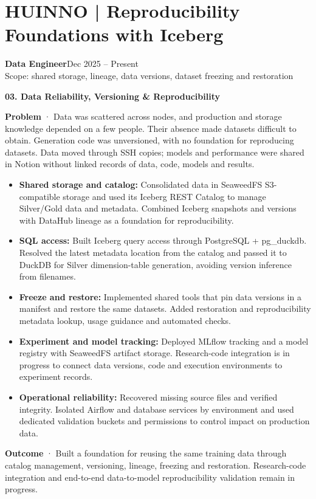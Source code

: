\documentclass[a4paper,10pt]{article}
\newcommand{\role}[3]{\textbf{#1}\hfill{\small #2}\\{\small\color{muted}#3}\par}
\newcommand{\project}[2]{\vspace{5pt}\textbf{\color{accent}#1}\hfill{\small\color{muted}#2}\par}
\begin{document}
\section{HUINNO | Reproducibility Foundations with Iceberg}
\role{Data Engineer}{Dec 2025 -- Present}{Scope: shared storage, lineage, data versions, dataset freezing and restoration}
\project{03. Data Reliability, Versioning \& Reproducibility}{}
\textbf{Problem} · Data was scattered across nodes, and production and storage knowledge depended on a few people. Their absence made datasets difficult to obtain. Generation code was unversioned, with no foundation for reproducing datasets. Data moved through SSH copies; models and performance were shared in Notion without linked records of data, code, models and results.
\begin{itemize}
\item \textbf{Shared storage and catalog:} Consolidated data in SeaweedFS S3-compatible storage and used its Iceberg REST Catalog to manage Silver/Gold data and metadata. Combined Iceberg snapshots and versions with DataHub lineage as a foundation for reproducibility.
\item \textbf{SQL access:} Built Iceberg query access through PostgreSQL + pg\_duckdb. Resolved the latest metadata location from the catalog and passed it to DuckDB for Silver dimension-table generation, avoiding version inference from filenames.
\item \textbf{Freeze and restore:} Implemented shared tools that pin data versions in a manifest and restore the same datasets. Added restoration and reproducibility metadata lookup, usage guidance and automated checks.
\item \textbf{Experiment and model tracking:} Deployed MLflow tracking and a model registry with SeaweedFS artifact storage. Research-code integration is in progress to connect data versions, code and execution environments to experiment records.
\item \textbf{Operational reliability:} Recovered missing source files and verified integrity. Isolated Airflow and database services by environment and used dedicated validation buckets and permissions to control impact on production data.
\end{itemize}
\textbf{Outcome} · Built a foundation for reusing the same training data through catalog management, versioning, lineage, freezing and restoration. Research-code integration and end-to-end data-to-model reproducibility validation remain in progress.
\end{document}
